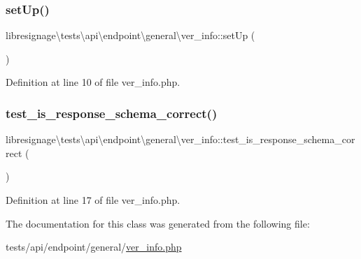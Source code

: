\subsubsection{\texorpdfstring{set\+Up()}{setUp()}}
{\footnotesize\ttfamily libresignage\textbackslash{}tests\textbackslash{}api\textbackslash{}endpoint\textbackslash{}general\textbackslash{}ver\+\_\+info\+::set\+Up (\begin{DoxyParamCaption}{ }\end{DoxyParamCaption})}



Definition at line 10 of file ver\+\_\+info.\+php.

\mbox{\label{classlibresignage_1_1tests_1_1api_1_1endpoint_1_1general_1_1ver__info_af1c904d43dcda78d1de77d07d0729249}} 
\subsubsection{\texorpdfstring{test\+\_\+is\+\_\+response\+\_\+schema\+\_\+correct()}{test\_is\_response\_schema\_correct()}}
{\footnotesize\ttfamily libresignage\textbackslash{}tests\textbackslash{}api\textbackslash{}endpoint\textbackslash{}general\textbackslash{}ver\+\_\+info\+::test\+\_\+is\+\_\+response\+\_\+schema\+\_\+correct (\begin{DoxyParamCaption}{ }\end{DoxyParamCaption})}



Definition at line 17 of file ver\+\_\+info.\+php.



The documentation for this class was generated from the following file\+:\begin{DoxyCompactItemize}
\item 
tests/api/endpoint/general/\hyperlink{tests_2api_2endpoint_2general_2ver__info_8php}{ver\+\_\+info.\+php}\end{DoxyCompactItemize}
